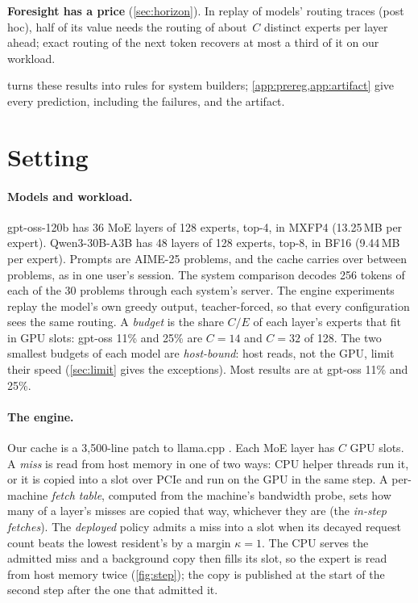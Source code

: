 \textbf{Foresight has a price} (\cref{sec:horizon}). In replay of \fsModels{} models' routing traces (post hoc), half of
its value needs the routing of about \dcMed$\,C$ distinct experts per layer ahead; exact routing of the next token
recovers at most a third of it on our workload.

 turns these results into rules for system builders; \cref{app:prereg,app:artifact} give
every prediction, including the failures, and the artifact.


\section{Setting}\label{sec:setting}
\paragraph{Models and workload.} gpt-oss-120b has 36 MoE layers of 128 experts, top-4, in MXFP4 (13.25\,MB per
expert). Qwen3-30B-A3B has 48 layers of 128 experts, top-8, in BF16 (9.44\,MB per expert). Prompts are AIME-25
problems, and the cache carries over between problems, as in one user's session. The system comparison decodes 256
tokens of each of the 30 problems through each system's server. The engine experiments replay the model's own greedy
output, teacher-forced, so that every configuration sees the same routing. A \emph{budget} is the share $C/E$ of each
layer's experts that fit in GPU slots: gpt-oss 11\% and 25\% are $C{=}14$ and $C{=}32$ of 128. The two smallest budgets
of each model are \emph{host-bound}: host reads, not the GPU, limit their speed (\cref{sec:limit} gives the
exceptions). Most results are at gpt-oss 11\% and 25\%.

\paragraph{The engine.} Our cache is a 3{,}500-line patch to llama.cpp \citep{llamacpp}. Each MoE layer has $C$ GPU
slots. A \emph{miss} is read from host memory in one of two ways: CPU helper threads run it, or it is copied into a
slot over PCIe and run on the GPU in the same step. A per-machine \emph{fetch table}, computed from the machine's
bandwidth probe, sets how many of a layer's misses are copied that way, whichever they are (the \emph{in-step
fetches}). The \emph{deployed} policy admits a miss into a slot
when its decayed request count beats the lowest resident's by a margin $\kappa{=}1$. The CPU serves the admitted miss
and a background copy then fills its slot, so the expert is read from host memory twice (\cref{fig:step}); the copy
is published at the start of the second step after the one that admitted it.

